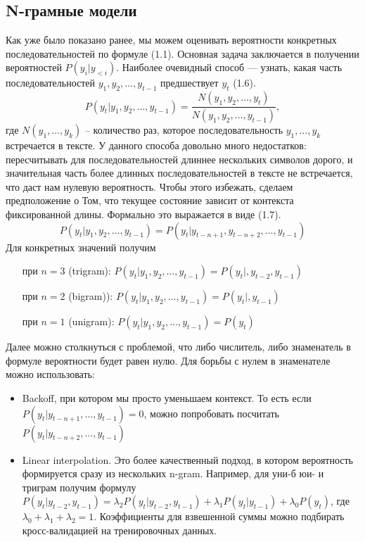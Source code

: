 \subsection{N-грамные модели}
\label{sub:domain:n_gram}

Как уже было показано ранее, мы можем оценивать вероятности конкретных последовательностей по формуле (1.1). Основная задача заключается в получении вероятностей $P(y_i|y_{<i})$. Наиболее очевидный способ --- узнать, какая часть последовательностей $y_1, y_2,\dots, y_{t-1}$ предшествует $y_t$ (1.6).
\begin{equation}
	P(y_t|y_1,y_2,\dots,y_{t-1}) = \frac{N(y_1,y_2,\dots,y_t)}{N(y_1,y_2,\dots,y_{t-1})},
\end{equation} где $N(y_1,\dots,y_k)$ -- количество раз, которое последовательность $y_1,\dots,y_k$ встречается в тексте. У данного способа довольно много недостатков: пересчитывать для последовательностей длиннее нескольких символов дорого, и значительная часть более длинных последовательностей в тексте не встречается, что даст нам нулевую вероятность. Чтобы этого избежать, сделаем предположение о Том, что текущее состояние зависит от контекста фиксированной длины. Формально это выражается в виде (1.7).
\begin{equation}
	P(y_t|y_1,y_2,\dots,y_{t-1}) = P(y_t|y_{t-n+1}, y_{t-n+2},\dots,y_{t-1})
\end{equation}
Для конкретных значений получим
\begin{itemize}
	\item[при] $n = 3$ (trigram): $P(y_t|y_1,y_2,\dots,y_{t-1}) = P(y_t|, y_{t-2},y_{t-1})$
	\item[при] $n = 2$ (bigram)): $P(y_t|y_1,y_2,\dots,y_{t-1}) = P(y_t|, y_{t-1})$
	\item[при] $n = 1$ (unigram): $P(y_t|y_1,y_2,\dots,y_{t-1}) = P(y_t)$
\end{itemize}

Далее можно столкнуться с проблемой, что либо числитель, либо знаменатель в формуле вероятности будет равен нулю. Для борьбы с нулем в знаменателе можно использовать:

\begin{itemize}
	\item Backoff, при котором мы просто уменьшаем контекст. То есть если $P(y_t|y_{t-n+1},\dots,y_{t-1}) = 0$, можно попробовать посчитать $P(y_t|y_{t-n+2},\dots,y_{t-1})$
	\item Linear interpolation. Это более качественный подход, в котором вероятность формируется сразу из нескольких n-gram. Например, для уни-б юи- и триграм получим формулу $P(y_t|y_{t-2}, y_{t-1}) = \lambda_2P(y_t|y_{t-2}, y_{t-1}) + \lambda_1P(y_t|y_{t-1}) + \lambda_0P(y_t)$, где $\lambda_0 + \lambda_1 + \lambda_2 = 1$. Коэффициенты для взвешенной суммы можно подбирать кросс-валидацией на тренировочных данных.
\end{itemize}

